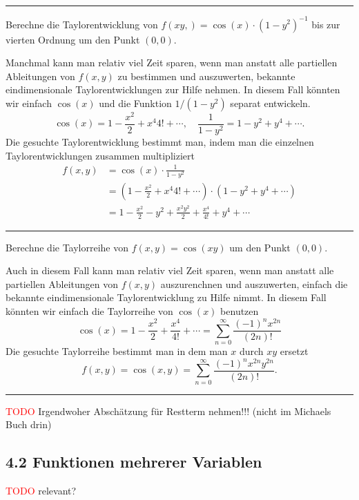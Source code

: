 \documentclass[a4paper,landscape,8pt]{extarticle}
\newcommand{\todo}{\textcolor{red}{TODO }}
\newcommand{\sep}{\vspace{5pt}\noindent\hrule\vspace{5pt}}
\begin{document}
\begin{multicols*}{4}
\sep

\Bsp Berechne die Taylorentwicklung von $f(xy,)=\cos(x)\cdot (1-y^2)^{-1}$ bis
zur vierten Ordnung um den Punkt $(0,0)$.

\Trick Manchmal kann man relativ viel Zeit sparen, wenn man anstatt alle
partiellen Ableitungen von $f(x,y)$ zu bestimmen und auszuwerten, bekannte
eindimensionale Taylorentwicklungen zur Hilfe nehmen. In diesem Fall könnten wir
einfach $\cos(x)$ und die Funktion $1/(1-y^2)$ separat entwickeln.
\[
\cos(x) = 1 - \frac{x^2}{2} +{x^4}{4!} + \cdots,
\quad  
\frac{1}{1-y^2} = 1 - y^2 + y^4 + \cdots.
\]
Die gesuchte Taylorentwicklung bestimmt man, indem man die einzelnen
Taylorentwicklungen zusammen multipliziert
\begin{align*}
f(x,y) &= \cos(x)\cdot\frac{1}{1-y^2}\\
&= (1 - \frac{x^2}{2} +{x^4}{4!} + \cdots)\cdot
\left(1 - y^2 + y^4 + \cdots\right)\\
&= 1 - \frac{x^2}{2} - y^2 + \frac{x^2y^2}{2} + \frac{x^4}{4!} + y^4 + \cdots
\end{align*}

\sep

\Bsp Berechne die Taylorreihe von $f(x,y)=\cos(xy)$ um den Punkt $(0,0)$.

\Trick Auch in diesem Fall kann man relativ viel Zeit sparen, wenn man anstatt
alle partiellen Ableitungen von $f(x,y)$ auszurenchnen und auszuwerten, einfach
die bekannte eindimensionale Taylorentwicklung zu Hilfe nimmt. In diesem Fall
könnten wir einfach die Taylorreihe von $\cos(x)$ benutzen
\[
\cos(x) = 1 - \frac{x^2}{2}+\frac{x^4}{4!} + \cdots 
= \sum_{n=0}^{\infty}\frac{(-1)^nx^{2n}}{(2n)!}
\]
Die gesuchte Taylorreihe bestimmt man in dem man $x$ durch $xy$ ersetzt
\[
f(x,y) = \cos(x,y) = \sum_{n=0}^\infty \frac{(-1)^nx^{2n}y^{2n}}{(2n)!}.
\]
\sep

\todo Irgendwoher Abschätzung für Restterm nehmen!!! (nicht im Michaels Buch
drin)

\begin{warmup}
\subsection{4.2 Funktionen mehrerer Variablen}

\todo relevant?

\end{warmup}











\end{multicols*}
\end{document}

